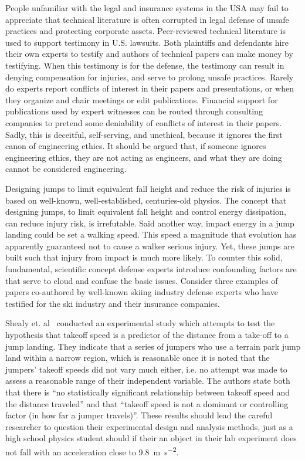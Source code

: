 \documentclass{article}
\begin{document}
People unfamiliar with the legal and insurance systems in the USA may fail to
appreciate that technical literature is often corrupted in legal defense of
unsafe practices and protecting corporate assets. Peer-reviewed technical
literature is used to support testimony in U.S. lawsuits. Both plaintiffs and
defendants hire their own experts to testify and authors of technical papers
can make money by testifying. When this testimony is for the defense, the
testimony can result in denying compensation for injuries, and serve to prolong
unsafe practices. Rarely do experts report conflicts of interest in their
papers and presentations, or when they organize and chair meetings or edit
publications. Financial support for publications used by expert witnesses can
be routed through consulting companies to pretend some deniability of conflicts
of interest in their papers. Sadly, this is deceitful, self-serving, and
unethical, because it ignores the first canon of engineering ethics. It should
be argued that, if someone ignores engineering ethics, they are not acting as
engineers, and what they are doing cannot be considered engineering.

Designing jumps to limit equivalent fall height and reduce the risk of injuries
is based on well-known, well-established, centuries-old physics. The concept
that designing jumps, to limit equivalent fall height and control energy
dissipation, can reduce injury risk, is irrefutable. Said another way, impact
energy in a jump landing could be set a walking speed. This speed a magnitude
that evolution has apparently guaranteed not to cause a walker serious injury.
Yet, these jumps are built such that injury from impact is much more likely. To
counter this solid, fundamental, scientific concept defense experts introduce
confounding factors are that serve to cloud and confuse the basic issues.
Consider three examples of papers co-authored by well-known skiing industry
defense experts who have testified for the ski industry and their insurance
companies.

Shealy et. al~\cite{Shealy2010} conducted an experimental study which attempts
to test the hypothesis that takeoff speed is a predictor of the distance from a
take-off to a jump landing. They indicate that a series of jumpers who use a
terrain park jump land within a narrow region, which is reasonable once it is
noted that the jumpers' takeoff speeds did not vary much either, i.e. no
attempt was made to assess a reasonable range of their independent variable.
The authors state both that there is ``no statistically significant
relationship between takeoff speed and the distance traveled'' and that
``takeoff speed is not a dominant or controlling factor (in how far a jumper
travels)''. These results should lead the careful researcher to question their
experimental design and analysis methods, just as a high school physics student
should if their an object in their lab experiment does not fall with an
acceleration close to 9.8~\si{\meter\per\second\squared}.
\end{document}
